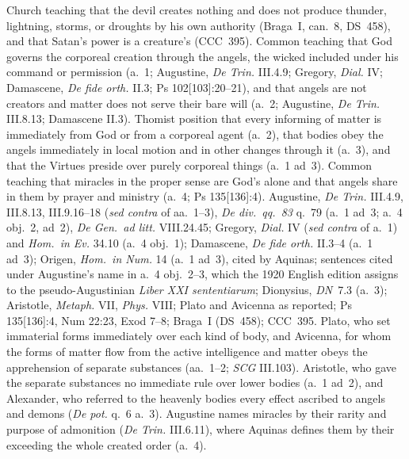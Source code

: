  {Church teaching that the devil creates nothing and does not produce
 thunder, lightning, storms, or droughts by his own authority (Braga~I,
 can.~8, DS~458), and that Satan's power is a creature's (CCC~395). Common
 teaching that God governs the corporeal creation through the angels, the
 wicked included under his command or permission (a.~1; Augustine,
 \emph{De Trin.} III.4.9; Gregory, \emph{Dial.} IV; Damascene, \emph{De
 fide orth.} II.3; Ps 102[103]:20--21), and that angels are not creators
 and matter does not serve their bare will (a.~2; Augustine, \emph{De
 Trin.} III.8.13; Damascene II.3). Thomist position that every informing
 of matter is immediately from God or from a corporeal agent (a.~2), that
 bodies obey the angels immediately in local motion and in other changes
 through it (a.~3), and that the Virtues preside over purely corporeal
 things (a.~1 ad~3). Common teaching that miracles in the proper sense are
 God's alone and that angels share in them by prayer and ministry (a.~4;
 Ps 135[136]:4).}
 {Augustine, \emph{De Trin.} III.4.9, III.8.13, III.9.16--18 (\emph{sed
 contra} of aa.~1--3), \emph{De div.\ qq.\ 83} q.~79 (a.~1 ad~3; a.~4
 obj.~2, ad~2), \emph{De Gen.\ ad litt.} VIII.24.45; Gregory, \emph{Dial.}
 IV (\emph{sed contra} of a.~1) and \emph{Hom.\ in Ev.} 34.10 (a.~4
 obj.~1); Damascene, \emph{De fide orth.} II.3--4 (a.~1 ad~3); Origen, \emph{Hom.\ in Num.} 14 (a.~1 ad~3), cited by
 Aquinas; sentences cited under Augustine's name in a.~4 obj.~2--3, which the 1920
 English edition assigns to the pseudo-Augustinian \emph{Liber XXI
 sententiarum}; Dionysius, \emph{DN}~7.3 (a.~3); Aristotle,
 \emph{Metaph.} VII, \emph{Phys.} VIII; Plato and Avicenna as reported;
 Ps 135[136]:4, Num 22:23, Exod 7--8; Braga~I (DS~458); CCC~395.}
 {Plato, who set immaterial forms immediately over each kind of body, and
 Avicenna, for whom the forms of matter flow from the active intelligence
 and matter obeys the apprehension of separate substances (aa.~1--2;
 \emph{SCG} III.103). Aristotle, who gave the separate substances no
 immediate rule over lower bodies (a.~1 ad~2), and Alexander, who referred
 to the heavenly bodies every effect ascribed to angels and demons
 (\emph{De pot.} q.~6 a.~3). Augustine names miracles by their rarity and
 purpose of admonition (\emph{De Trin.} III.6.11), where Aquinas defines
 them by their exceeding the whole created order (a.~4).}

